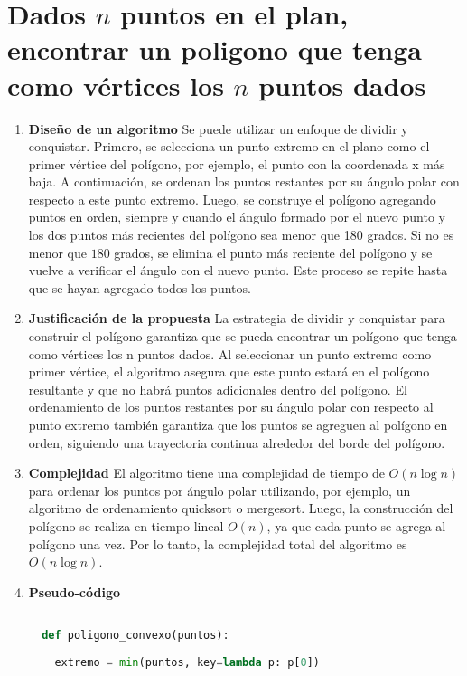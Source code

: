 \section{Dados $n$ puntos en el plan, encontrar un poligono que tenga como vértices los $n$ puntos dados}

\begin{enumerate}
  \item \textbf{Diseño de un algoritmo}
  Se puede utilizar un enfoque de dividir y conquistar. Primero, se selecciona un punto extremo en el plano como el primer vértice del polígono, por ejemplo, el punto con la coordenada x más baja. A continuación, se ordenan los puntos restantes por su ángulo polar con respecto a este punto extremo. Luego, se construye el polígono agregando puntos en orden, siempre y cuando el ángulo formado por el nuevo punto y los dos puntos más recientes del polígono sea menor que 180 grados. Si no es menor que $180$ grados, se elimina el punto más reciente del polígono y se vuelve a verificar el ángulo con el nuevo punto. Este proceso se repite hasta que se hayan agregado todos los puntos.
  \item \textbf{Justificación de la propuesta}
  La estrategia de dividir y conquistar para construir el polígono garantiza que se pueda encontrar un polígono que tenga como vértices los n puntos dados. Al seleccionar un punto extremo como primer vértice, el algoritmo asegura que este punto estará en el polígono resultante y que no habrá puntos adicionales dentro del polígono. El ordenamiento de los puntos restantes por su ángulo polar con respecto al punto extremo también garantiza que los puntos se agreguen al polígono en orden, siguiendo una trayectoria continua alrededor del borde del polígono.
  \item \textbf{Complejidad}
  El algoritmo tiene una complejidad de tiempo de $O(n\log n)$ para ordenar los puntos por ángulo polar utilizando, por ejemplo, un algoritmo de ordenamiento quicksort o mergesort. Luego, la construcción del polígono se realiza en tiempo lineal $O(n)$, ya que cada punto se agrega al polígono una vez. Por lo tanto, la complejidad total del algoritmo es $O(n\log n)$.
  \item \textbf{Pseudo-código}
  
  \begin{lstlisting}[language = python]

  def poligono_convexo(puntos):
    
    extremo = min(puntos, key=lambda p: p[0])
    

\end{lstlisting}
\end{enumerate}
